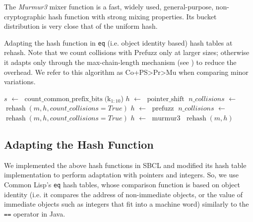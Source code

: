 \documentclass[sigconf]{acmart}
\newcommand*\Let[2]{\State #1 $\gets$ #2}
\newcommand*\lisp[1]{\texttt{#1}}
\renewcommand{\label}[1]{%
    \gdef\sfname{sf:##1}}%
\begin{document}
The \emph{Murmur3} mixer function is a fast, widely used, general-purpose, non-cryptographic hash function with strong mixing properties.
Its bucket distribution is very close that of the uniform hash.

\begin{algorithm}[t]
  \caption{\small Adapting the hash function in \lisp{eq} (i.e. object identity based) hash tables at rehash.
Note that we count collisions with Prefuzz only at larger sizes; otherwise it adapts only through the max-chain-length mechanism (see ) to reduce the overhead.
We refer to this algorithm as Co+PS>Pr>Mu when comparing minor variations.}
  \label{alg:rehash-eq}
  \begin{algorithmic}[1]
          \Let{$s$}{$\operatorname{count\_common\_prefix\_bits}(\textrm{k}_{1:10}$)}
          \Let{$h$}{$\operatorname{pointer\_shift}$}
        \EndIf
      \EndIf
        \Let{$\mathit{n\_collisions}$}{$\operatorname{rehash}(m, h, \mathit{count\_collisions=True})$}
          \Let{$h$}{$\operatorname{prefuzz}$}
        \EndIf
      \EndIf
        \Else
          \Let{$\mathit{n\_collisions}$}{$\operatorname{rehash}(m, h, \mathit{count\_collisions=True})$}
            \Let{$h$}{$\operatorname{murmur3}$}
          \EndIf
        \EndIf
      \EndIf
        \State $\operatorname{rehash}(m, h)$
      \EndIf
    \EndProcedure
  \end{algorithmic}
\end{algorithm}

\subsection{Adapting the Hash Function}
\label{sec:choosing-the-hash-function}

We implemented the above hash functions in SBCL and modified its hash table implementation to perform adaptation with pointers and integers.
So, we use Common Lisp's \lisp{eq} hash tables, whose comparison function is based on object identity (i.e. it compares the address of non-immediate objects, or the value of immediate objects such as integers that fit into a machine word) similarly to the \texttt{==} operator in Java.
\end{document}

